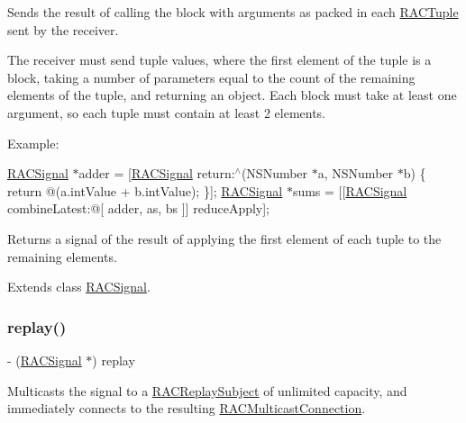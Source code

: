 Sends the result of calling the block with arguments as packed in each \mbox{\hyperlink{interface_r_a_c_tuple}{R\+A\+C\+Tuple}} sent by the receiver.

The receiver must send tuple values, where the first element of the tuple is a block, taking a number of parameters equal to the count of the remaining elements of the tuple, and returning an object. Each block must take at least one argument, so each tuple must contain at least 2 elements.

Example\+:

\mbox{\hyperlink{interface_r_a_c_signal}{R\+A\+C\+Signal}} $\ast$adder = \mbox{[}\mbox{\hyperlink{interface_r_a_c_signal}{R\+A\+C\+Signal}} return\+:$^\wedge$(N\+S\+Number $\ast$a, N\+S\+Number $\ast$b) \{ return @(a.\+int\+Value + b.\+int\+Value); \}\mbox{]}; \mbox{\hyperlink{interface_r_a_c_signal}{R\+A\+C\+Signal}} $\ast$sums = \mbox{[}\mbox{[}\mbox{\hyperlink{interface_r_a_c_signal}{R\+A\+C\+Signal}} combine\+Latest\+:@\mbox{[} adder, as, bs \mbox{]}\mbox{]} reduce\+Apply\mbox{]};

Returns a signal of the result of applying the first element of each tuple to the remaining elements. 

Extends class \mbox{\hyperlink{interface_r_a_c_signal_a60241be15dba6de172d2ab14be09b657}{R\+A\+C\+Signal}}.

\mbox{\label{category_r_a_c_signal_07_operations_08_a6d7d83297f6b837dd5efc18c38483a94}} 
\subsubsection{\texorpdfstring{replay()}{replay()}\hspace{0.1cm}{\footnotesize\ttfamily [1/3]}}
{\footnotesize\ttfamily -\/ (\mbox{\hyperlink{interface_r_a_c_signal}{R\+A\+C\+Signal}} $\ast$) replay \begin{DoxyParamCaption}{ }\end{DoxyParamCaption}}

Multicasts the signal to a \mbox{\hyperlink{interface_r_a_c_replay_subject}{R\+A\+C\+Replay\+Subject}} of unlimited capacity, and immediately connects to the resulting \mbox{\hyperlink{interface_r_a_c_multicast_connection}{R\+A\+C\+Multicast\+Connection}}.

